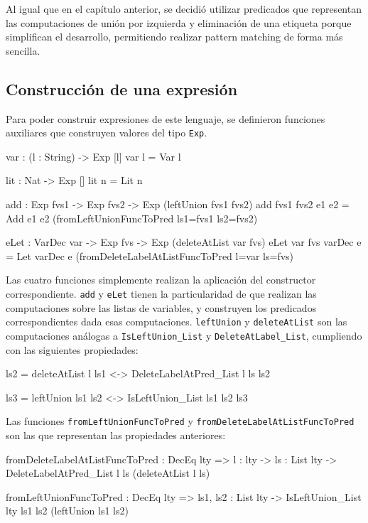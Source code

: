 Al igual que en el capítulo anterior, se decidió utilizar predicados que representan las computaciones de unión por izquierda y eliminación de una etiqueta porque simplifican el desarrollo, permitiendo realizar pattern matching de forma más sencilla.

\subsection{Construcción de una expresión}

Para poder construir expresiones de este lenguaje, se definieron funciones auxiliares que construyen valores del tipo \texttt{Exp}.

\begin{code}
var : (l : String) -> Exp [l]
var l = Var l

lit : Nat -> Exp []
lit n = Lit n

add : Exp fvs1 -> Exp fvs2 -> Exp (leftUnion fvs1 fvs2)
add {fvs1} {fvs2} e1 e2 = Add e1 e2
  (fromLeftUnionFuncToPred {ls1=fvs1} {ls2=fvs2})

eLet : VarDec var -> Exp fvs -> Exp (deleteAtList var fvs)
eLet {var} {fvs} varDec e = Let varDec e 
  (fromDeleteLabelAtListFuncToPred {l=var} {ls=fvs})
\end{code}

Las cuatro funciones simplemente realizan la aplicación del constructor correspondiente. \texttt{add} y \texttt{eLet} tienen la particularidad de que realizan las computaciones sobre las listas de variables, y construyen los predicados correspondientes dada esas computaciones. \texttt{leftUnion} y \texttt{deleteAtList} son las computaciones análogas a \texttt{IsLeftUnion\_List} y \texttt{DeleteAtLabel\_List}, cumpliendo con las siguientes propiedades:

\begin{code}
ls2 = deleteAtList l ls1 <-> DeleteLabelAtPred_List l ls ls2

ls3 = leftUnion ls1 ls2 <-> IsLeftUnion_List ls1 ls2 ls3
\end{code}

Las funciones \texttt{fromLeftUnionFuncToPred} y \texttt{fromDeleteLabelAtListFuncToPred} son las que representan las propiedades anteriores:

\begin{code}
fromDeleteLabelAtListFuncToPred : DecEq lty => {l : lty} -> 
  {ls : List lty} -> DeleteLabelAtPred_List l ls (deleteAtList l ls)

fromLeftUnionFuncToPred : DecEq lty => {ls1, ls2 : List lty} -> 
  IsLeftUnion_List {lty} ls1 ls2 (leftUnion ls1 ls2)  
\end{code}

